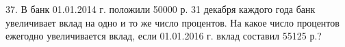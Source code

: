 37. В банк 01.01.2014 г. положили 50000 р. 31 декабря каждого года банк увеличивает вклад на одно и то же число процентов. На какое число процентов ежегодно увеличивается вклад, если 01.01.2016 г. вклад составил 55125 р.?\\
